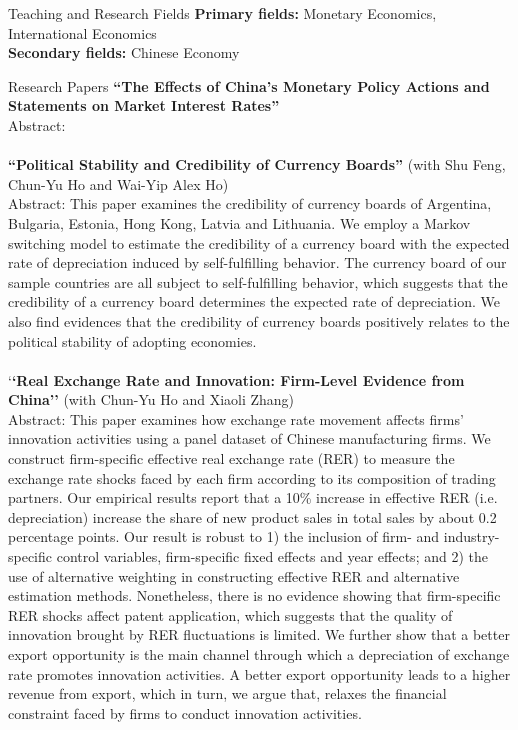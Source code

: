 \documentclass{resume_liang} %
\begin{document}
\begin{rSection}{Teaching and Research Fields}
{\bf Primary fields:} Monetary Economics, International Economics \\ 
{\bf Secondary fields:} Chinese Economy  \\
\end{rSection}
\bigskip \bigskip






\begin{rSection}{Research Papers}
\textbf{``The Effects of China's Monetary Policy Actions and Statements on Market Interest Rates''}\\
Abstract: 
\\
\\
\textbf{``Political Stability and Credibility of Currency Boards''} (with Shu Feng, Chun-Yu Ho and Wai-Yip Alex Ho) \\
Abstract: This paper examines the credibility of currency boards of Argentina, Bulgaria, Estonia, Hong Kong, Latvia and Lithuania. We employ a Markov switching model to estimate the credibility of a currency board with the expected rate of depreciation induced by self-fulfilling behavior. The currency board of our sample countries are all subject to self-fulfilling behavior, which suggests that the credibility of a currency board determines the expected rate of depreciation. We also find evidences that the credibility of currency boards positively relates to the political stability of adopting economies.
\\
\\
`\textbf{`Real Exchange Rate and Innovation: Firm-Level Evidence from China''} (with Chun-Yu Ho and Xiaoli Zhang) \\
Abstract: This paper examines how exchange rate movement affects firms' innovation activities using a panel dataset of Chinese manufacturing firms. We construct firm-specific effective real exchange rate (RER) to measure the exchange rate shocks faced by each firm according to its composition of trading partners.  Our empirical results report that a 10\% increase in effective RER (i.e. depreciation) increase the share of new product sales in total sales by about 0.2 percentage points. Our result is robust to 1) the inclusion of firm- and industry-specific control variables, firm-specific fixed effects and year effects; and 2) the use of alternative weighting in constructing effective RER and alternative estimation methods. Nonetheless, there is no evidence showing that firm-specific RER shocks affect patent application, which suggests that the quality of innovation brought by RER fluctuations is limited. We further show that a better export opportunity is the main channel through which a depreciation of exchange rate promotes innovation activities. A better export opportunity leads to a higher revenue from export, which in turn, we argue that, relaxes the financial constraint faced by firms to conduct innovation activities.

\end{rSection}
\end{document}
